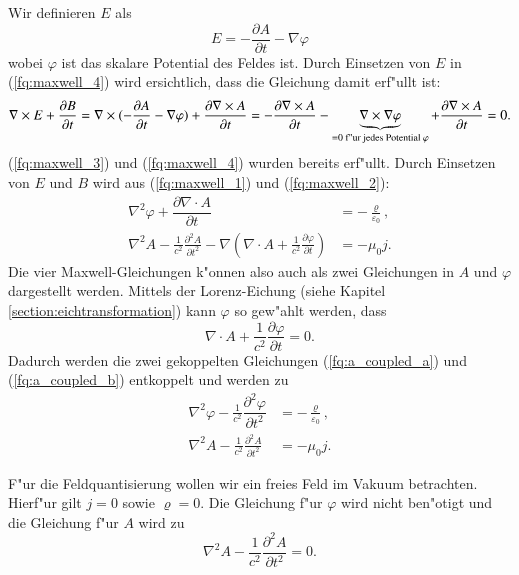 \begin{refsection}
Wir definieren $E$ als
\begin{equation}
E = -\dfrac{\partial A}{\partial t} - \nabla \varphi
\end{equation}
wobei $\varphi$ ist das skalare Potential des Feldes ist. Durch Einsetzen von $E$ in (\ref{fq:maxwell_4}) wird ersichtlich, dass die Gleichung damit erf"ullt ist:
\begin{equation*}
\nabla\times E + \frac{\partial B }{\partial t} = \nabla\times (-\dfrac{\partial A}{\partial t} - \nabla \varphi) + \frac{\partial \nabla\times A }{\partial t} = 
- \frac{\partial \nabla\times A }{\partial t} - \underbrace{\nabla\times \nabla \varphi}_{=0\text{ f"ur jedes Potential } \varphi} + \frac{\partial \nabla\times A }{\partial t} = 0.\\
\end{equation*}
(\ref{fq:maxwell_3}) und (\ref{fq:maxwell_4}) wurden bereits erf"ullt. Durch Einsetzen von $E$ und $B$ wird aus (\ref{fq:maxwell_1}) und (\ref{fq:maxwell_2}):
\begin{align} 
 \label{fq:a_coupled_a}
 \nabla^2 \varphi + \dfrac{\partial \nabla \cdot A}{\partial t} &= -\frac{\varrho}{\varepsilon_0}, \\
 \label{fq:a_coupled_b}
 \nabla^2 A - \frac{1}{c^2} \frac{\partial^2 A }{\partial t^2} - \nabla \left( \nabla \cdot A + \frac{1}{c^2} \frac{\partial \varphi }{\partial t} \right) &= - \mu_0 j.
\end{align}
Die vier Maxwell-Gleichungen k"onnen also auch als zwei Gleichungen in $A$ und $\varphi$ dargestellt werden.
Mittels der Lorenz-Eichung (siehe Kapitel \ref{section:eichtransformation}) kann $\varphi$ so gew"ahlt werden, dass
\begin{equation} \label{fq:lorenz_eq}
\nabla \cdot A + \frac{1}{c^2} \frac{\partial \varphi }{\partial t} = 0.
\end{equation}
Dadurch werden die zwei gekoppelten Gleichungen (\ref{fq:a_coupled_a}) und (\ref{fq:a_coupled_b}) entkoppelt und werden zu
\begin{align*}
\nabla^2 \varphi - \frac{1}{c^2} \dfrac{\partial^2 \varphi}{\partial t^2} &= -\frac{\varrho}{\varepsilon_0}, \\
\nabla^2 A - \frac{1}{c^2} \frac{\partial^2 A }{\partial t^2} &= - \mu_0 j.
\end{align*}

F"ur die Feldquantisierung wollen wir ein freies Feld im Vakuum betrachten. Hierf"ur gilt $j = 0$ sowie $\varrho = 0$.
Die Gleichung f"ur $\varphi$ wird nicht ben"otigt und die Gleichung f"ur $A$ wird zu
\begin{equation} \label{fq:wave_dgl}
\nabla^2 A - \frac{1}{c^2} \frac{\partial^2 A }{\partial t^2} = 0.
\end{equation}


\end{refsection}

